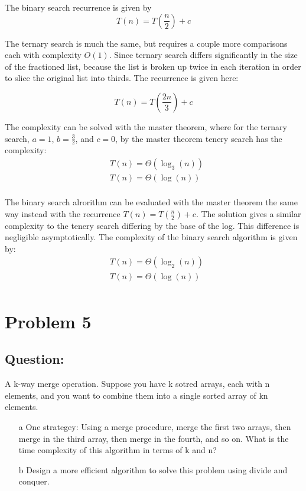 \documentclass[12pt]{article}
\begin{document}
      The binary search recurrence is given by 
      $$T(n) = T(\frac{n}{2}) + c$$
      
      The ternary search is much the same, but requires a couple more comparisons each with complexity $O(1)$. Since ternary search differs significantly in the size of the fractioned list, because the list is broken up twice in each iteration in order to slice the original list into thirds. The recurrence is given here:

      $$T(n) = T(\frac{2n}{3}) + c$$

      The complexity can be solved with the master theorem, where for the ternary search, $a = 1$, $b = \frac{3}{2}$, and $c = 0$, by the master theorem tenery search has the complexity: 
    \begin{equation}
      \begin{aligned}
        & T(n) = \Theta(\log_3(n)) \\
        & T(n) = \Theta(\log(n)) \\
      \end{aligned}
    \end{equation}

     
      The binary search alrorithm can be evaluated with the master theorem the same way instead with the recurrence $T(n) = T(\frac{n}{2}) + c$. The solution gives a similar complexity to the tenery search differing by the base of the log. This difference is negligible asymptotically. The complexity of the binary search algorithm is given by:
      \begin{equation}
        \begin{aligned}
          & T(n) = \Theta(\log_2(n)) \\
          & T(n) = \Theta(\log(n)) \\
        \end{aligned}
      \end{equation}

\pagebreak

\section{Problem 5}

    \subsection{Question:}
      A k-way merge operation. Suppose you have k sotred arrays, each with n elements, and you want to combine them into a single sorted array of kn elements.
      \begin{itemize}
        \item[a] One strategey: Using a merge procedure, merge the first two arrays, then merge in the third array, then merge in the fourth, and so on. What is the time complexity of this algorithm in terms of k and n?
        \item[b] Design a more efficient algorithm to solve this problem using divide and conquer.
      \end{itemize} 
     
\end{document}
